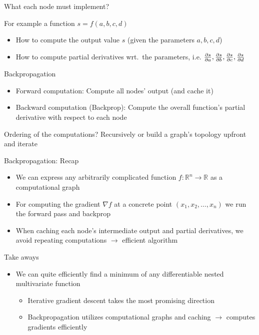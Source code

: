 \documentclass[12pt,aspectratio=169,handout]{beamer}
\begin{document}
\begin{frame}{What each node must implement?}
	
	For example a function $s = f(a, b, c, d)$
	
	\begin{itemize}
		\item How to compute the output value $s$ (given the parameters $a, b, c, d$)
		\item How to compute partial derivatives wrt.\ the parameters, i.e. $\pdv{s}{a}, \pdv{s}{b}, \pdv{s}{c}, \pdv{s}{d}$
	\end{itemize}
	
\end{frame}

\begin{frame}{Backpropagation}
	
	\begin{itemize}
		\item Forward computation: Compute all nodes' output (and cache it)
		\item Backward computation (Backprop): Compute the overall function's partial derivative with respect to each node
	\end{itemize}
	
	\bigskip
	
	Ordering of the computations? Recursively or build a graph's topology upfront and iterate
	
\end{frame}


\begin{frame}{Backpropagation: Recap}
	\begin{itemize}
		\item We can express any arbitrarily complicated function $f: \mathbb{R}^n \to \mathbb{R}$ as a computational graph
		\item For computing the gradient $\nabla f$ at a concrete point $(x_1, x_2, \ldots, x_n)$ we run the forward pass and backprop
		\item When caching each node's intermediate output and partial derivatives, we avoid repeating computations $\to$ efficient algorithm
	\end{itemize}
\end{frame}



\begin{frame}{Take aways}
	
	\begin{itemize}
		
		\item We can quite efficiently find a minimum of any differentiable nested multivariate function
		\begin{itemize}
			\item Iterative gradient descent takes the most promising direction
			\item Backpropagation utilizes computational graphs and caching $\to$ computes gradients efficiently
		\end{itemize}
	\end{itemize}
	
\end{frame}
\end{document}
